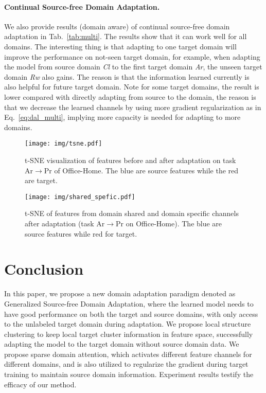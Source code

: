 \documentclass[10pt,twocolumn,letterpaper]{article}
\begin{document}
\vspace{-2mm}
\paragraph{Continual Source-free Domain Adaptation.}
We also provide results (domain aware) of continual source-free domain adaptation in Tab.~\ref{tab:multi}. The results show that it can work well for all domains. The interesting thing is that adapting to one target domain will improve the performance on not-seen target domain, for example, when adapting the model from source domain \emph{Cl} to the first target domain \emph{Ar}, the unseen target domain \emph{Rw} also gains. The reason is that the information learned currently is also helpful for future target domain. Note for some target domains, the result is lower compared with directly adapting from source to the domain, the reason is that we decrease the learned channels by using more gradient regularization as in Eq.~\ref{eq:dal_multi}, implying more capacity is needed for adapting to more domains.

\begin{figure}[!tbp]
	\centering
	\texttt{[image: img/tsne.pdf]}\vspace{-3mm}
	\caption{t-SNE visualization of features before and after adaptation on task Ar$\rightarrow$Pr of Office-Home. The blue are source features while the red are target.\vspace{-2mm}}
	\label{fig:tsne}
	\vspace{-2mm}
\end{figure}

\begin{figure}[!tbp]
	\centering
	\texttt{[image: img/shared\_spefic.pdf]}\vspace{-3mm}
	\caption{t-SNE of features from domain shared and domain specific channels after adaptation (task Ar$\rightarrow$Pr on Office-Home). The blue are source features while red for target.\vspace{-2mm}}
	\label{fig:tsne_ss}
	\vspace{-6mm}
\end{figure}

\vspace{-2mm}
\section{Conclusion}
In this paper, we propose a new domain adaptation paradigm denoted as Generalized Source-free Domain Adaptation, where the learned model needs to have good performance on both the target and source domains, with only access to the unlabeled target domain during adaptation. We propose local structure clustering to keep local target cluster information in feature space, successfully adapting the model to the target domain without source domain data. We propose sparse domain attention, which activates different feature channels for different domains, and is also utilized to regularize the gradient during target training to maintain source domain information. 
Experiment results testify the efficacy of our method.
\end{document}
